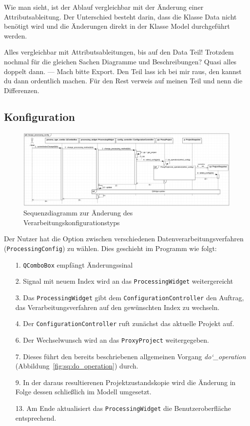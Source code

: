 \documentclass{article}
\begin{document}
Wie man sieht, ist der Ablauf vergleichbar mit der Änderung einer Attributsableitung. Der Unterschied besteht darin, dass die Klasse Data nicht benötigt wird und die Änderungen direkt in der Klasse Model durchgeführt werden.

Alles vergleichbar mit Attributsableitungen, bis auf den Data Teil!
Trotzdem nochmal für die gleichen Sachen Diagramme und Beschreibungen? Quasi alles doppelt dann. --- Mach bitte Export. Den Teil lass ich bei mir raus, den kannst du dann ordentlich machen. Für den Rest verweis auf meinen Teil und nenn die Differenzen.


\subsection{Konfiguration}
\begin{figure}[H]%
    \centering
    \includegraphics[width=13cm]{entwurf/Entwurf_dokument/img/Michael/sd_change_processing_config.png}
    \caption{Sequenzdiagramm zur Änderung des Verarbeitungskonfigurationstyps}
\end{figure}

Der Nutzer hat die Option zwischen verschiedenen Datenverarbeitungsverfahren (\texttt{ProcessingConfig}) zu wählen. Dies geschieht im Programm wie folgt:
\begin{enumerate}
    \item[1.] \texttt{QComboBox} empfängt Änderungssinal
    \item[2.] Signal mit neuem Index wird an das \texttt{ProcessingWidget} weitergereicht
    \item[3.] Das \texttt{ProcessingWidget} gibt dem \texttt{ConfigurationController} den Auftrag, das Verarbeitungsverfahren auf den gewünschten Index zu wechseln.
    \item[4.] Der \texttt{ConfigurationController} ruft zunächst das aktuelle Projekt auf.
    \item[6.] Der Wechselwunsch wird an das \texttt{ProxyProject} weitergegeben.
    \item[7.] Dieses führt den bereits beschriebenen allgemeinen Vorgang \emph{do\char`_operation} (Abbildung~\ref{fig:sq:do_operation}) durch.
    \item[9.] In der daraus resultierenen Projektzustandskopie wird die Änderung in Folge dessen schließlich im Modell umgesetzt.
    \item[13.] Am Ende aktualisiert das \texttt{ProcessingWidget} die Benutzeroberfläche entsprechend.
\end{enumerate}
\end{document}
